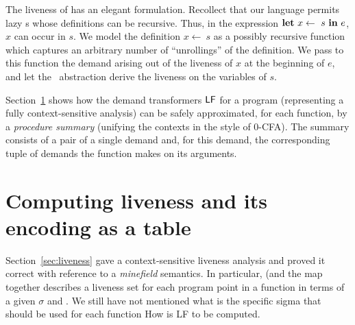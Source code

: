 \documentclass[9pt]{sigplanconf}
\newcommand{\mycomment}[1]{}
\begin{document}
  
 The  liveness of {\LET} has  an elegant  formulation.   Recollect that  our
 language permits lazy {\LET}s whose definitions can be recursive. Thus,
 in the expression $\mbox{$\mathbf{ let}$}~x  \leftarrow~s~\mbox{$\mathbf{ in}$}~e$, $x$ can occur in $s$.
 We  model the  definition $x  \leftarrow~s$ as  a  possibly recursive
 function which captures an  arbitrary number of ``unrollings'' of the
 definition.  We pass  to this function the demand  arising out of the
 liveness   of  $x$   at   the   beginning  of   $e$,   and  let   the
 \Lfonly\ abstraction derive the liveness on the variables of $s$.


\mycomment{The function  $\mathcal{L}$ now  gives  the  (total)  liveness of  an
expression $e$.   The cases $\RETURN$ and  $\SIF$ are straightforward,
but note the liveness $x.\epsilon$  generated by the latter.  The case
$(\LET\   z\leftarrow   s\  \IN\   e')$   resembles  a   three-address
instruction:  the liveness  of $e$  is given  by taking  the liveness,
$\Lv$, of $e'$, killing any liveness of $z$ and adding any incremental
liveness from  $s$.  The main subtlety  is how the liveness  of $z$ in
$\Lv$  is converted  to a  demand  $\Lv(z)$ to  be placed  on $s$  via
$\mathit{ref}(s,\Lv(z),\Lfonly)$.



We make three observations: firstly the rule ({\sc live-define}) has a
least  solution  as  $\mathcal{L}(\cdot)$  is monotonic  in  $\sigma$;
secondly  that  ({\sc  live-define})   resembles  the  rule  for  type
inference of mutually recursive  function definitions, and thirdly the
asymmetry of  demand and liveness (compared to  post- and pre-liveness
classically) is due to the functional formulation here.
}%

Section~\ref{sec:computing}   shows   how   the  demand   transformers
$\mathsf{LF}$  for  a  program  (representing  a  fully  context-sensitive
analysis) can  be safely  approximated, for each  function, by  a {\em
  procedure summary} (unifying the  contexts in the style of 0-CFA)\@.
The  summary consists  of a  pair  of a  single demand  and, for  this
demand, the corresponding  tuple of demands the function  makes on its
arguments.

\section{Computing liveness and its encoding as a table}\label{sec:computing}
Section~\ref{sec:liveness} gave a context-sensitive liveness
analysis and {\color {red}  proved it correct with reference
  to   a  {\em   minefield}   semantics}.   In   particular,
  (and  the  map   together
describes  a  liveness  set  for  each program  point  in  a
function in terms of a  given $\sigma$ and \Lfonly. We still
have not mentioned what is the specific sigma that should be
used for each function How is LF to be computed.
\end{document}
